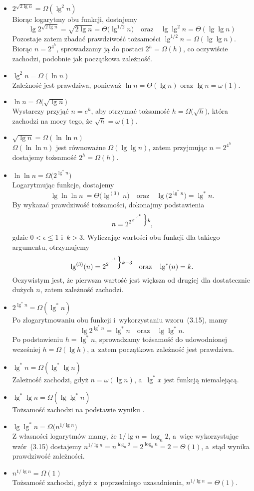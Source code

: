 \begin{itemize}
\item $2^{\sqrt{2\lg n}}=\Omega(\lg^2 n)$ \\
	Biorąc logarytmy obu funkcji, dostajemy
	\[
		\lg2^{\sqrt{2\lg n}} = \sqrt{2\lg n} = \Theta\bigl(\lg^{1/2}n\bigr) \quad\text{oraz}\quad \lg\lg^2n = \Theta(\lg\lg n)
	\]
	Pozostaje zatem zbadać prawdziwość tożsamości $\lg^{1/2}n=\Omega(\lg\lg n)$. Biorąc $n=2^{4^h}$, sprowadzamy ją do postaci $2^h=\Omega(h)$, co oczywiście zachodzi, podobnie jak początkowa zależność.
\item $\lg^2n=\Omega(\ln n)$ \\
	Zależność jest prawdziwa, ponieważ $\ln n=\Theta(\lg n)$ oraz $\lg n=\omega(1)$.
\item $\ln n=\Omega\bigl(\!\sqrt{\lg n}\bigr)$ \\
	Wystarczy przyjąć $n=e^h$, aby otrzymać tożsamość $h=\Omega\bigl(\!\sqrt{h}\bigr)$, która zachodzi na mocy tego, że $\sqrt{h}=\omega(1)$.
\item $\sqrt{\lg n}=\Omega(\ln\ln n)$ \\
	$\Omega(\ln\ln n)$ jest równoważne $\Omega(\lg\lg n)$, zatem przyjmując $n=2^{4^h}$ dostajemy tożsamość $2^h=\Omega(h)$.
\item $\ln\ln n=\Omega\bigl(2^{\lg^*n}\bigr)$ \\
	Logarytmując funkcje, dostajemy
	\[
		\lg\ln\ln n~= \Theta\bigl(\lg^{(3)}n\bigr) \quad\text{oraz}\quad \lg\bigl(2^{\lg^*n}\bigr) = \lg^*n.
	\]
	By wykazać prawdziwość tożsamości, dokonajmy podstawienia
	\[
		n = 2^{2^{2^{\cdot^{\cdot^{\cdot^\epsilon}}}}}\vbox{\hbox{$\Big\}\scriptstyle k$}\kern0pt},
	\]
	gdzie $0<\epsilon\le1$ i~$k>3$. Wyliczając wartości obu funkcji dla takiego argumentu, otrzymujemy
	\[
		\lg^{(3)}(n) = 2^{2^{\cdot^{\cdot^{\cdot^\epsilon}}}}\vbox{\hbox{$\Big\}\scriptstyle k-3$}\kern0pt} \quad\text{oraz}\quad \lg^*(n)=k.
	\]
	Oczywistym jest, że pierwsza wartość jest większa od drugiej dla dostatecznie dużych $n$, zatem zależność zachodzi.
\item $2^{\lg^*n}=\Omega(\lg^*n)$ \\
	Po zlogarytmowaniu obu funkcji i~wykorzystaniu wzoru~(3.15), mamy
	\[
		\lg2^{\lg^*n} = \lg^*n \quad\text{oraz}\quad \lg\lg^*n.
	\]
	Po podstawieniu $h=\lg^*n$, sprowadzamy tożsamość do udowodnionej wcześniej $h=\Omega(\lg h)$, a~zatem początkowa zależność jest prawdziwa.
\item $\lg^*n=\Omega(\lg^*\lg n)$ \\
	Zależność zachodzi, gdyż $n=\omega(\lg n)$, a~$\lg^*x$ jest funkcją niemalejącą.
\item $\lg^*\lg n=\Omega(\lg\lg^*n)$ \\
	Tożsamość zachodzi na podstawie wyniku .
\item $\lg\lg^*n=\Omega\bigl(n^{1/\!\lg n}\bigr)$ \\
	Z własności logarytmów mamy, że $1/\!\lg n=\log_n2$, a~więc wykorzystując wzór~(3.15) dostajemy $n^{1/\!\lg n}=n^{\log_n2}=2^{\log_nn}=2=\Theta(1)$, a~stąd wynika prawdziwość zależności.
\item $n^{1/\!\lg n}=\Omega(1)$ \\
	Tożsamość zachodzi, gdyż z~poprzedniego uzasadnienia, $n^{1/\!\lg n}=\Theta(1)$.
\end{itemize}

